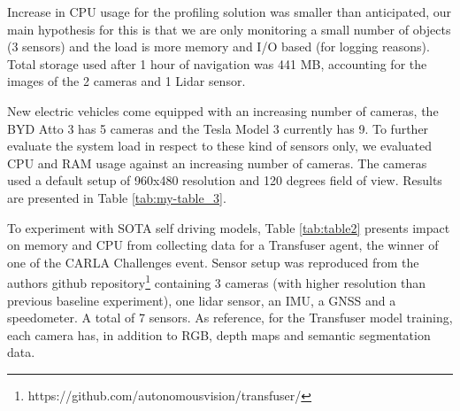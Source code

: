 Increase in CPU usage for the profiling solution was smaller than anticipated, our main hypothesis for this is that we are only monitoring a small number of objects (3 sensors) and the load is more memory and I/O based (for logging reasons). Total storage used after 1 hour of navigation was 441 MB, accounting for the images of the 2 cameras and 1 Lidar sensor.

New electric vehicles come equipped with an increasing number of cameras, the BYD Atto 3 has 5 cameras and the Tesla Model 3 currently has 9. To further evaluate the system load in respect to these kind of sensors only, we evaluated CPU and RAM usage against an increasing number of cameras. The cameras used a default setup of 960x480 resolution and 120 degrees field of view. Results are presented in Table \ref{tab:my-table_3}.

\begin{table}[!ht]
\centering
{}
\caption{Total memory and CPU usage for an increasing number of cameras, both increase linearly with the number of cameras.}
\label{tab:my-table_3}
\end{table}

To experiment with SOTA self driving models, Table \ref{tab:table2} presents impact on memory and CPU from collecting data for a Transfuser \cite{chitta2022transfuser} agent, the winner of one of the CARLA Challenges event. Sensor setup was reproduced from the authors github repository\footnote[9]{https://github.com/autonomousvision/transfuser/} containing 3 cameras (with higher resolution than previous baseline experiment), one lidar sensor, an IMU, a GNSS and a speedometer. A total of 7 sensors. As reference, for the Transfuser model training, each camera has, in addition to RGB, depth maps and semantic segmentation data.

